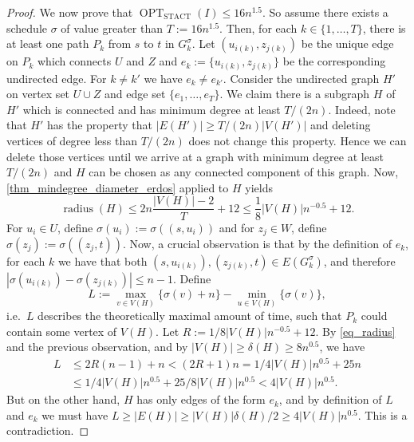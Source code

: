 \documentclass[runningheads]{llncs}
\numberwithin{equation}{section}
\newcommand{\set}[1]{\{ #1 \}}
\newcommand{\fromto}[2]{\set{#1, \ldots, #2}}
\DeclareMathOperator{\radius}{\text{radius}}
\DeclareMathOperator{\opt}{OPT}
\newcommand{\optDirStAct}{\opt_\text{STACT}}
\begin{document}
\begin{proof}
We now prove that $\optDirStAct(I) \leq 16n^{1.5}$. So assume there exists a schedule $\sigma$ of value greater than $T := 16n^{1.5}$. Then, for each $k \in \fromto{1}{T}$, there is at least one path $P_{k}$ from $s$ to $t$ in $G^\sigma_{k}$. Let $(u_{i(k)}, z_{j(k)})$ be the unique edge on $P_k$ which connects $U$ and $Z$ and $e_{k} := \{u_{i(k)}, z_{j(k)}\}$ be the corresponding undirected edge. For $k \neq k'$ we have $e_{k} \neq e_{k'}$. Consider the undirected graph $H'$ on vertex set $U \cup Z$ and edge set $\fromto{e_1}{e_T}$. 
We claim there is a subgraph $H$ of $H'$ which is connected and has minimum degree at least $T/(2n)$. Indeed, note that $H'$ has the property that $|E(H')| \geq T/(2n)|V(H')|$ and deleting vertices of degree less than $T/(2n)$ does not change this property. Hence we can delete those vertices until we arrive at a graph with minimum degree at least $T/(2n)$ and $H$ can be chosen as any connected component of this graph. Now, \cref{thm_mindegree_diameter_erdos} applied to $H$ yields
\begin{equation}
\radius(H) \leq 2n\frac{|V(H)| - 2}{T} + 12  \leq \frac 1{8}|V(H)|n^{-0.5}+12. \label{eq_radius}
\end{equation}
For $u_i \in U$, define $\sigma(u_i) := \sigma((s,u_i))$ and for $z_j \in W$, define $\sigma(z_j) := \sigma((z_j,t))$. Now, a crucial observation is that by the definition of $e_k$, for each $k$ we have that both $(s,u_{i(k)}), (z_{j(k)}, t) \in E(G_k^\sigma)$, and therefore $|\sigma(u_{i(k)}) - \sigma(z_{j(k)})| \leq n - 1$. Define 
\[ L := \max_{v \in V(H)}\set{ \sigma(v) + n } - \min_{u \in V(H)} \set{\sigma(v)}, \]
 i.e.\ $L$ describes the theoretically maximal amount of time, such that $P_k$ could contain some vertex of $V(H)$. Let $R := 1/8|V(H)|n^{-0.5} +12$. By \cref{eq_radius} and the previous observation, and by $|V(H)| \geq \delta(H) \geq 8n^{0.5}$, we have 
\begin{align*}
L &\leq 2R(n-1) + n < (2R + 1)n = 1/4|V(H)|n^{0.5} + 25n\\ 
&\leq 1/4|V(H)|n^{0.5} + 25/8|V(H)|n^{0.5} < 4|V(H)|n^{0.5}.
\end{align*}
But on the other hand, $H$ has only edges of the form $e_k$, and by definition of $L$ and $e_k$ we must have $L \geq |E(H)| \geq |V(H)|\delta(H)/2 \geq 4|V(H)|n^{0.5}$. This is a contradiction.
\end{proof} 

\end{document}
